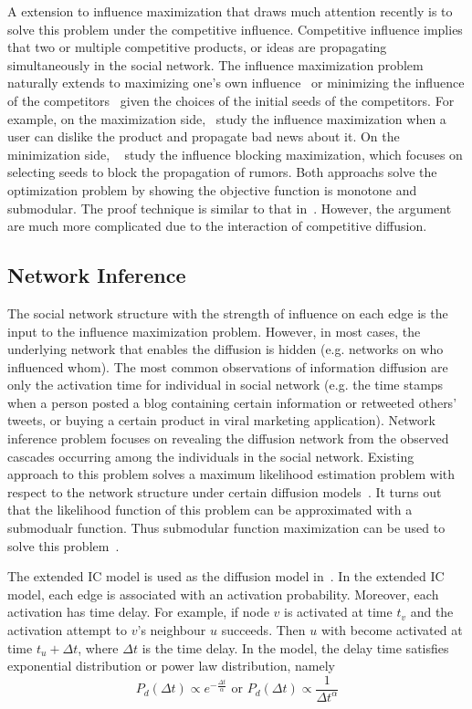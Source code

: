 A extension to influence maximization that draws much attention recently is to solve this problem under the competitive influence. Competitive influence implies that two or multiple competitive products, or ideas are propagating simultaneously in the social network. The influence maximization problem naturally extends to maximizing one's own influence~\cite{Bharathi:2007,Borodin:2010,chen2011influence} or
minimizing the influence of the competitors~\cite{he2012influence,Budak:2011} given the choices of the initial seeds of the competitors. For example, on the maximization side,~\cite{ChenCCKLRSWWY11} study the influence maximization when a user can dislike the product and propagate bad news about it. On the minimization side, ~\cite{HSCJ2012} study the influence blocking maximization, which focuses on selecting seeds to block the propagation of rumors. Both approachs solve the optimization problem by showing the objective function is monotone and submodular. The proof technique is similar to that in~\cite{KKT03}. However, the argument are much more complicated due to the interaction of competitive diffusion.
\subsection{Network Inference}
The social network structure with the strength of influence on each edge is the input to the influence maximization problem. However, in most cases, the underlying network that enables the diffusion is hidden (e.g. networks on who influenced whom). The most common observations of information diffusion are only the activation time for individual in social network (e.g. the time stamps  when a person posted a blog containing certain information or retweeted others' tweets, or buying a certain product in viral marketing application). Network inference problem focuses on revealing the diffusion network from the observed cascades occurring among the individuals in the social network. Existing approach to this problem solves a maximum likelihood estimation problem with respect to the network structure under certain diffusion models~\cite{GJA10,GB12,GDB11,SJ10}. It turns out that the likelihood function of this problem can be approximated with a submodualr function. Thus submodular function maximization can be used to solve this problem~\cite{GJA10,GB12}.

The extended IC model is used as the diffusion model in~\cite{GJA10,GB12}. In the extended IC model, each edge is associated with an activation probability. Moreover, each activation has time delay. For example, if node $v$ is activated at time $t_v$ and the activation attempt to $v$'s neighbour $u$ succeeds. Then $u$ with become activated at time $t_u+\Delta t$, where $\Delta t$ is the time delay. In the model, the delay time satisfies exponential distribution or power law distribution, namely
$$
P_d(\Delta t)\propto e^{-\frac{\Delta t}{\alpha}} \text{\ or\ } P_d(\Delta t)\propto\frac{1}{\Delta t^\alpha}
$$

